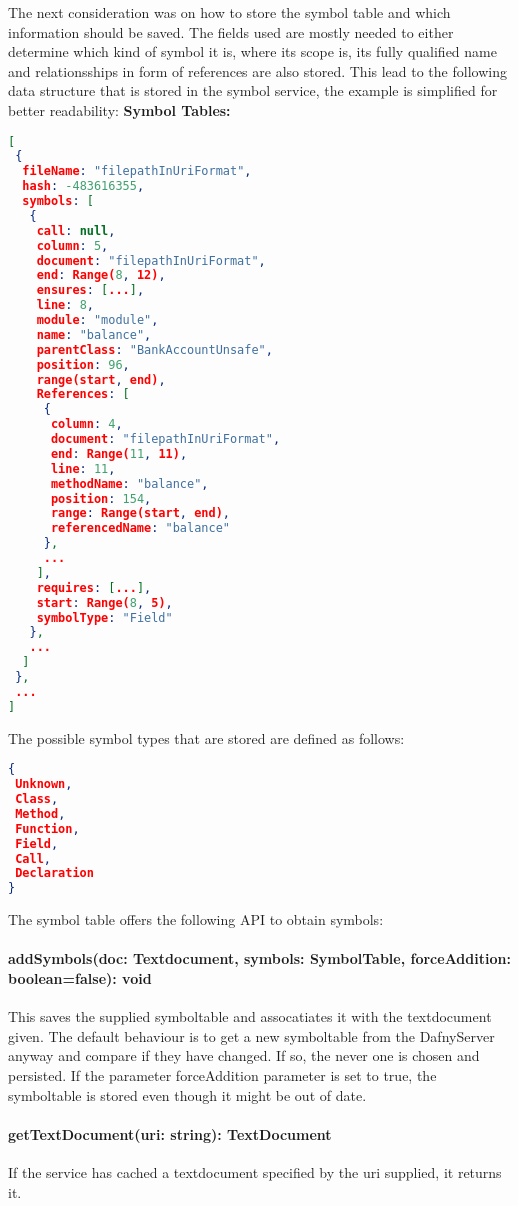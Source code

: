 The next consideration was on how to store the symbol table and which information should be saved. The fields used are mostly needed to either determine which kind of symbol it is, where its scope is, its fully qualified name and relationsships in form of references are also stored. This lead to the following data structure that is stored in the symbol service, the example is simplified for better readability: \newline
\newline\newline
\textbf{Symbol Tables: }
\begin{lstlisting}[language=json,firstnumber=1]
[
 {
  fileName: "filepathInUriFormat",
  hash: -483616355,
  symbols: [
   {
    call: null,
    column: 5,
    document: "filepathInUriFormat",
    end: Range(8, 12),
    ensures: [...],
    line: 8,
    module: "module",
    name: "balance",
    parentClass: "BankAccountUnsafe",
    position: 96,
    range(start, end),
    References: [
     {
      column: 4,
      document: "filepathInUriFormat",
      end: Range(11, 11),
      line: 11,
      methodName: "balance",
      position: 154,
      range: Range(start, end),
      referencedName: "balance"
     },
     ...
    ],
    requires: [...],
    start: Range(8, 5),
    symbolType: "Field"
   },
   ...
  ]
 },
 ...
]
\end{lstlisting}

The possible symbol types that are stored are defined as follows:
\begin{lstlisting}[language=json,firstnumber=1]
{
 Unknown,
 Class,
 Method,
 Function,
 Field,
 Call,
 Declaration	
}

\end{lstlisting}
The symbol table offers the following API to obtain symbols: \newline
\paragraph{addSymbols(doc: Textdocument, symbols: SymbolTable, forceAddition: boolean=false): void} This saves the supplied symboltable and assocatiates it with the textdocument given. The default behaviour is to get a new symboltable from the DafnyServer anyway and compare if they have changed. If so, the never one is chosen and persisted. If the parameter forceAddition parameter is set to true, the symboltable is stored even though it might be out of date.

\paragraph{getTextDocument(uri: string): TextDocument} If the service has cached a textdocument specified by the uri supplied, it returns it.

